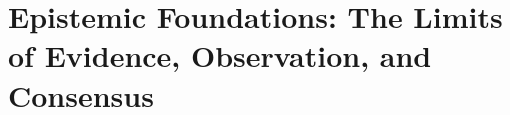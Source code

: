 \documentclass[11pt,twoside]{book}
\begin{document}
\frontmatter
\tableofcontents

\mainmatter
\part{Epistemic Foundations: The Limits of Evidence, Observation, and Consensus}





\backmatter
\appendix


\end{document}
